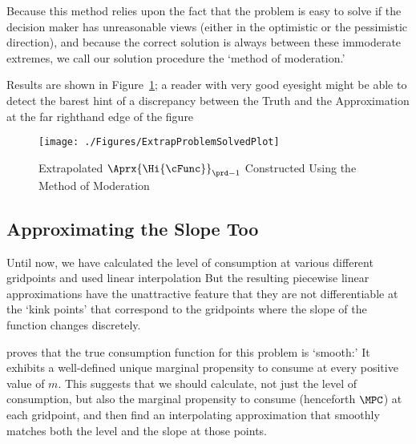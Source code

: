   Because this method relies upon the fact that the problem is easy to
  solve if the decision maker has unreasonable views (either in the
  optimistic or the pessimistic direction), and because the correct
  solution is always between these immoderate extremes, we call our
  solution procedure the `method of moderation.'

  Results are shown in Figure~\ref{fig:ExtrapProblemSolved}; a reader
  with very good eyesight might be able to detect the barest hint of a
  discrepancy between the Truth and the Approximation at the far
  righthand edge of the figure
  \hypertarget{ExtrapProblemSolvedPlot}{}
  \begin{figure}
    \texttt{[image: ./Figures/ExtrapProblemSolvedPlot]}
    \caption{Extrapolated $\Aprx{\Hi{\cFunc}}_{\prd-1}$ Constructed Using the Method of Moderation}
    \label{fig:ExtrapProblemSolved}
  \end{figure}

\hypertarget{approximating-the-slope-too}{}
\subsection{Approximating the Slope Too}


Until now, we have calculated the level of consumption at various different gridpoints and used linear interpolation  But the resulting piecewise linear approximations have the unattractive feature that they are not differentiable at the `kink points' that correspond to the gridpoints where the slope of the function changes discretely.



\cite{BufferStockTheory} proves that the true consumption function for
this problem
is `smooth:' It
exhibits a well-defined unique marginal propensity to consume at every
positive value of ${m}$.  This suggests that we should calculate, not
just the level of consumption, but also the marginal propensity to
consume (henceforth $\MPC$) at each gridpoint, and then find an
interpolating approximation that smoothly matches both the level and the slope
at those points.

